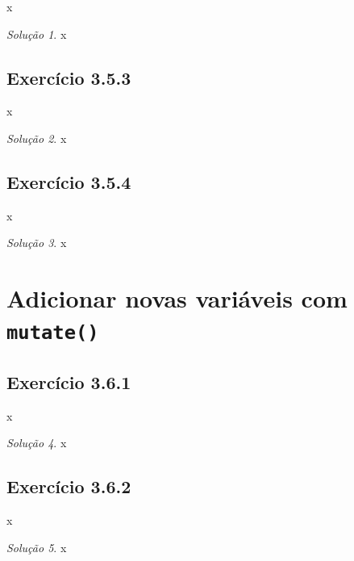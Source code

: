 \documentclass[
]{latex/krantz}
\theoremstyle{definition}
\theoremstyle{definition}
\theoremstyle{definition}
\theoremstyle{definition}
\theoremstyle{remark}
\newtheorem*{solution}{Solução}
\begin{document}
x

\begin{solution}
x
\end{solution}

\hypertarget{exr3-5-3}{%
\subsection*{Exercício 3.5.3}\label{exr3-5-3}}

x

\begin{solution}
x
\end{solution}

\hypertarget{exr3-5-4}{%
\subsection*{Exercício 3.5.4}\label{exr3-5-4}}

x

\begin{solution}
x
\end{solution}

\hypertarget{adicionar-novas-variuxe1veis-com-mutate}{%
\section{\texorpdfstring{Adicionar novas variáveis com \texttt{mutate()}}{Adicionar novas variáveis com mutate()}}\label{adicionar-novas-variuxe1veis-com-mutate}}

\hypertarget{exr3-6-1}{%
\subsection*{Exercício 3.6.1}\label{exr3-6-1}}

x

\begin{solution}
x
\end{solution}

\hypertarget{exr3-6-2}{%
\subsection*{Exercício 3.6.2}\label{exr3-6-2}}

x

\begin{solution}
x
\end{solution}
\end{document}

